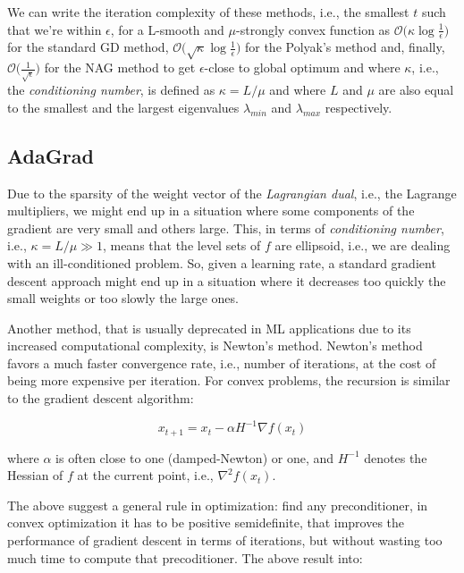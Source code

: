\bigskip

We can write the iteration complexity of these methods, i.e., the smallest $t$ such that we’re within $\epsilon$, for a L-smooth and $\mu$-strongly convex function as $\displaystyle \mathcal{O}\Big(\kappa \log \frac{1}{\epsilon}\Big)$ for the standard GD method, $\displaystyle \mathcal{O}\Big(\sqrt{\kappa}\log \frac{1}{\epsilon}\Big)$ for the Polyak’s method and, finally, $\displaystyle \mathcal{O}\Big(\frac{1}{\sqrt{\epsilon}}\Big)$ for the NAG method to get $\epsilon$-close to global optimum and where $\kappa$, i.e., the \emph{conditioning number}, is defined as $\kappa = L/\mu$ and where $L$ and $\mu$ are also equal to the smallest and the largest eigenvalues $\lambda_{min}$ and $\lambda_{max}$ respectively.

\pagebreak

\subsection{AdaGrad}

Due to the sparsity of the weight vector of the \emph{Lagrangian dual}, i.e., the Lagrange multipliers, we might end up in a situation where some components of the gradient are very small and others large. This, in terms of \emph{conditioning number}, i.e., $\kappa = L/\mu \gg 1$, means that the level sets of $f$ are ellipsoid, i.e., we are dealing with an ill-conditioned problem. So, given a learning rate, a standard gradient descent approach might end up in a situation where it decreases too quickly the small weights or too slowly the large ones.

Another method, that is usually deprecated in ML applications due to its increased computational complexity, is Newton’s method. Newton’s method favors a much faster convergence rate, i.e., number of iterations, at the cost of being more expensive per iteration. For convex problems, the recursion is similar to the gradient descent algorithm:

$$
x_{t+1} = x_t - \alpha H^{-1} \nabla f(x_t)
$$

where $\alpha$ is often close to one (damped-Newton) or one, and $H^{-1}$ denotes the Hessian of $f$ at the current point, i.e., $\nabla^2 f(x_t)$.

The above suggest a general rule in optimization: find any preconditioner, in convex optimization it has to be positive semidefinite, that improves the performance of gradient descent in terms of iterations, but without wasting too much time to compute that precoditioner. The above result into:

